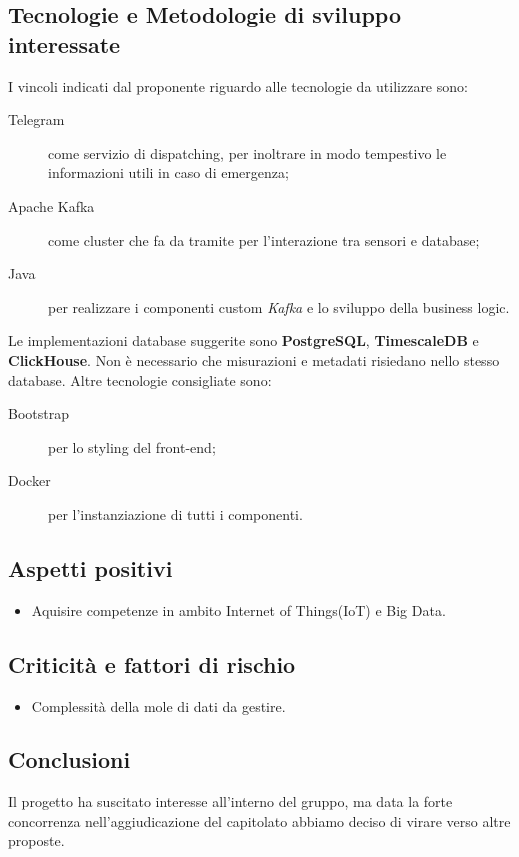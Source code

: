\documentclass[../studio-di-fattibilita.tex]{subfiles}
\begin{document}
	\subsection{Tecnologie e Metodologie di sviluppo interessate}
	\label{subsec:tecnologie_interessate}
	I vincoli indicati dal proponente riguardo alle tecnologie da utilizzare sono:
	\begin{description}
		\item[Telegram] come servizio di dispatching, per inoltrare in modo tempestivo le informazioni utili in caso di emergenza;
		\item[Apache Kafka] come cluster che fa da tramite per l'interazione tra sensori e database;
		\item[Java] per realizzare i componenti custom \textit{Kafka} e lo sviluppo della business logic.
	\end{description}
	Le implementazioni database suggerite sono \textbf{PostgreSQL}, \textbf{TimescaleDB} e \textbf{ClickHouse}.
	Non è necessario che misurazioni e metadati risiedano nello stesso database.
	Altre tecnologie consigliate sono:
	\begin{description}
		\item[Bootstrap] per lo styling del front-end;
		\item[Docker] per l'instanziazione di tutti i componenti.
	\end{description}


	\subsection{Aspetti positivi}
	\label{subsec:aspetti_positivi}
	\begin{itemize}
		\item Aquisire competenze in ambito Internet of Things(IoT) e Big Data.
	\end{itemize}


	\subsection{Criticità e fattori di rischio}
	\label{subsec:criticita_e_fattori_di_rischio}
	\begin{itemize}
		\item Complessità della mole di dati da gestire.
	\end{itemize}


	\subsection{Conclusioni}
	\label{subsec:conclusioni}
	Il progetto ha suscitato interesse all'interno del gruppo, ma data la forte concorrenza nell'aggiudicazione del capitolato abbiamo deciso di virare verso altre proposte.
	
\end{document}
